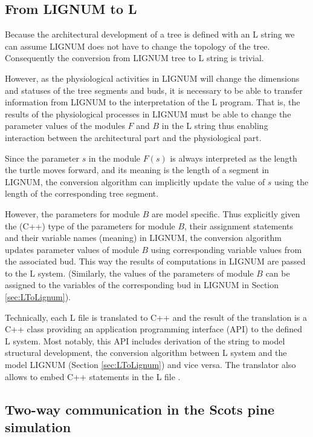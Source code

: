 \subsection{From LIGNUM to L}\label{sec:LignumToL}

Because the architectural  development of a tree is  defined with an L
string we  can assume LIGNUM does  not have to change  the topology of
the tree.  Consequently the conversion from LIGNUM tree to L string is
trivial.
  
However,    as     the    physiological    activities     in    LIGNUM
\citep{perttunen:96} will  change the  dimensions and statuses  of the
tree  segments  and buds,  it  is necessary  to  be  able to  transfer
information from LIGNUM to the  interpretation of the L program.  That
is, the results of the  physiological processes in LIGNUM must be able
to change  the parameter values  of the modules  $F$ and $B$ in  the L
string thus  enabling interaction  between the architectural  part and
the physiological part.

Since the parameter $s$ in  the module $F(s)$ is always interpreted as
the length the turtle moves forward,  and its meaning is the length of
a segment  in LIGNUM, the  conversion algorithm can  implicitly update
the value of $s$ using the length of the corresponding tree segment.

However,  the parameters  for  module $B$  are  model specific.   Thus
explicitly  given the  (C++) type  of the  parameters for  module $B$,
their  assignment statements  and  their variable  names (meaning)  in
LIGNUM, the  conversion algorithm  updates parameter values  of module
$B$ using corresponding variable values from the associated bud.  This
way the results of computations in  LIGNUM are passed to the L system.
(Similarly, the values of the parameters of module $B$ can be assigned
to  the  variables of  the  corresponding  bud  in LIGNUM  in  Section
\ref{sec:LToLignum}).

Technically, each  L file is translated  to C++ and the  result of the
translation  is  a  C++  class providing  an  application  programming
interface  (API) to  the defined  L  system.  Most  notably, this  API
includes derivation of the string to model structural development, the
conversion algorithm  between L system  and the model  LIGNUM (Section
\ref{sec:LToLignum}) and  vice versa.   The translator also  allows to
embed C++ statements in the L file \citep{pp:99a}.

\subsection{Two-way communication in the Scots pine simulation}

